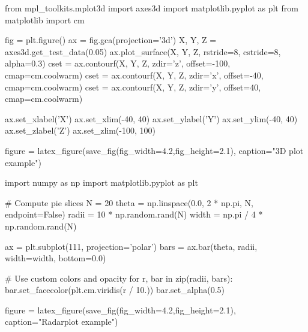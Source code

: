 \begin{pycode}[3dplot]
from mpl_toolkits.mplot3d import axes3d
import matplotlib.pyplot as plt
from matplotlib import cm

fig = plt.figure()
ax = fig.gca(projection='3d')
X, Y, Z = axes3d.get_test_data(0.05)
ax.plot_surface(X, Y, Z, rstride=8, cstride=8, alpha=0.3)
cset = ax.contourf(X, Y, Z, zdir='z', offset=-100, cmap=cm.coolwarm)
cset = ax.contourf(X, Y, Z, zdir='x', offset=-40, cmap=cm.coolwarm)
cset = ax.contourf(X, Y, Z, zdir='y', offset=40, cmap=cm.coolwarm)

ax.set_xlabel('X')
ax.set_xlim(-40, 40)
ax.set_ylabel('Y')
ax.set_ylim(-40, 40)
ax.set_zlabel('Z')
ax.set_zlim(-100, 100)

figure = latex_figure(save_fig(fig_width=4.2,fig_height=2.1), caption="3D plot example")
\end{pycode}
\begin{pycode}[radar]
import numpy as np
import matplotlib.pyplot as plt


# Compute pie slices
N = 20
theta = np.linspace(0.0, 2 * np.pi, N, endpoint=False)
radii = 10 * np.random.rand(N)
width = np.pi / 4 * np.random.rand(N)

ax = plt.subplot(111, projection='polar')
bars = ax.bar(theta, radii, width=width, bottom=0.0)

# Use custom colors and opacity
for r, bar in zip(radii, bars):
    bar.set_facecolor(plt.cm.viridis(r / 10.))
    bar.set_alpha(0.5)

figure = latex_figure(save_fig(fig_width=4.2,fig_height=2.1), caption="Radarplot example")
\end{pycode}
